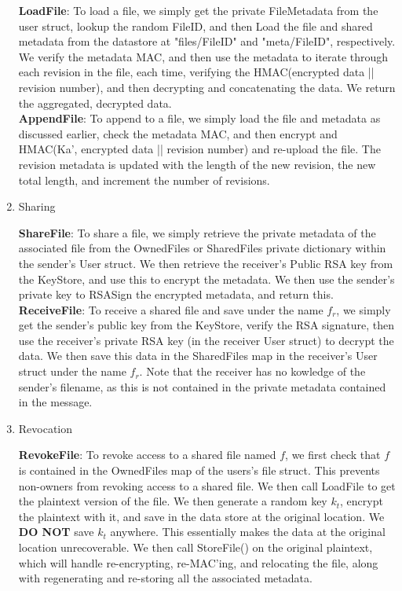 \documentclass[11pt]{article}
\begin{document}
\begin{enumerate}
\textbf{LoadFile}: To load a file, we simply get the private FileMetadata from the user struct, lookup the random FileID, and then Load the file and shared metadata from the datastore at "files/FileID" and "meta/FileID", respectively. We verify the metadata MAC, and then use the metadata to iterate through each revision in the file, each time, verifying the HMAC(encrypted data || revision number), and then decrypting and concatenating the data. We return the aggregated, decrypted data. \\

\textbf{AppendFile}: To append to a file, we simply load the file and metadata as discussed earlier, check the metadata MAC, and then encrypt and HMAC(Ka', encrypted data || revision number) and re-upload the file. The revision metadata is updated with the length of the new revision, the new total length, and increment the number of revisions.\\

\item{Sharing}

\textbf{ShareFile}: To share  a file, we simply retrieve the private metadata of the associated file from the OwnedFiles or SharedFiles private dictionary within the sender's User struct. We then retrieve the receiver's Public RSA key from the KeyStore, and use this to encrypt the metadata. We then use the sender's private key to RSASign the encrypted metadata, and return this.\\

\textbf{ReceiveFile}: To receive a shared file and save under the name $f_r$, we simply get the sender's public key from the KeyStore, verify the RSA signature, then use the receiver's private RSA key (in the receiver User struct) to decrypt the data. We then save this data in the SharedFiles map in the receiver's User struct under the name $f_r$. Note that the receiver has no kowledge of the sender's filename, as this is not contained in the private metadata contained in the message.\\

\item{Revocation}

\textbf{RevokeFile}: To revoke access to a shared file named $f$, we first check that $f$ is contained in the OwnedFiles map of the users's file struct. This prevents non-owners from revoking access to a shared file. We then call LoadFile to get the plaintext version of the file. We then generate a random key $k_t$, encrypt the plaintext with it, and save in the data store at the original location. We \textbf{DO NOT} save $k_t$ anywhere. This essentially makes the data at the original location unrecoverable. We then call StoreFile() on the original plaintext, which will handle re-encrypting, re-MAC'ing, and relocating the file, along with regenerating and re-storing all the associated metadata.

\end{enumerate}
\end{document}
